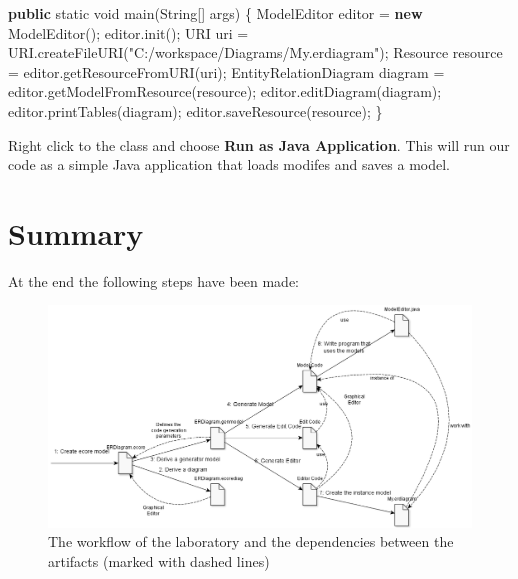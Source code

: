 \documentclass[]{report}
\newenvironment{Shaded}{}{}
\newcommand{\KeywordTok}[1]{\textcolor[rgb]{0.00,0.44,0.13}{\textbf{{#1}}}}
\newcommand{\DataTypeTok}[1]{\textcolor[rgb]{0.56,0.13,0.00}{{#1}}}
\newcommand{\StringTok}[1]{\textcolor[rgb]{0.25,0.44,0.63}{{#1}}}
\newcommand{\FunctionTok}[1]{\textcolor[rgb]{0.02,0.16,0.49}{{#1}}}
\newcommand{\NormalTok}[1]{{#1}}
\let\Oldincludegraphics\includegraphics
\renewcommand{\includegraphics}[1]{
\begin{adjustbox}{max size={\textwidth}{\textheight}}
    \Oldincludegraphics[scale=0.6]{#1}%
\end{adjustbox}
}
\begin{document}
\begin{enumerate}
\begin{Shaded}
\begin{Highlighting}[]
\KeywordTok{public} \DataTypeTok{static} \DataTypeTok{void} \FunctionTok{main}\NormalTok{(String[] args) \{}
   \NormalTok{ModelEditor editor = }\KeywordTok{new} \FunctionTok{ModelEditor}\NormalTok{();}
   \NormalTok{editor.}\FunctionTok{init}\NormalTok{();}
   \NormalTok{URI uri = URI.}\FunctionTok{createFileURI}\NormalTok{(}\StringTok{"C:/workspace/Diagrams/My.erdiagram"}\NormalTok{);}
   \NormalTok{Resource resource = editor.}\FunctionTok{getResourceFromURI}\NormalTok{(uri);}
   \NormalTok{EntityRelationDiagram diagram = editor.}\FunctionTok{getModelFromResource}\NormalTok{(resource);}
   \NormalTok{editor.}\FunctionTok{editDiagram}\NormalTok{(diagram);}
   \NormalTok{editor.}\FunctionTok{printTables}\NormalTok{(diagram);}
   \NormalTok{editor.}\FunctionTok{saveResource}\NormalTok{(resource);}
\NormalTok{\}}
\end{Highlighting}
\end{Shaded}

  Right click to the class and choose \textbf{Run as \textbar{} Java
  Application}. This will run our code as a simple Java application that
  loads modifes and saves a model.
\end{enumerate}

\section{Summary}

At the end the following steps have been made:

\begin{figure}[htbp]
\centering
\includegraphics{img/emf/ERD2.png}
\caption{The workflow of the laboratory and the dependencies between the
artifacts (marked with dashed lines)}
\end{figure}
\end{document}
